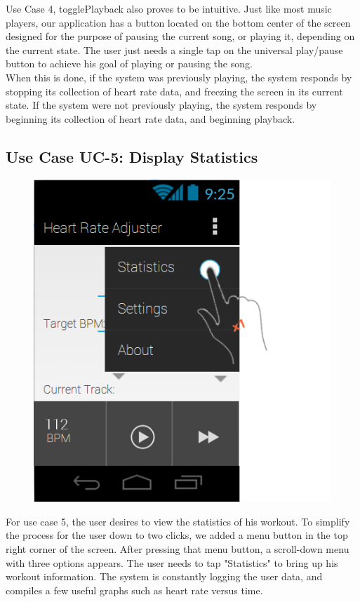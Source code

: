 \documentclass[letterpaper,english, 12pt]{scrreprt}
\begin{document}
Use Case 4, togglePlayback also proves to be intuitive. Just like most music players, our application has a button located on the bottom center of the screen designed for the purpose of pausing the current song, or playing it, depending on the current state. The user just needs a single tap on the universal play/pause button to achieve his goal of playing or pausing the song.\\

When this is done, if the system was previously playing, the system responds by stopping its collection of heart rate data, and freezing the screen in its current state. 
If the system were not previously playing, the system responds by beginning its collection of heart rate data, and beginning playback.

\subsection{Use Case UC-5: Display Statistics}

\begin{figure}[H]
	\centering
	\includegraphics{img/Prelim_Design/PrelimDesign_4.png}\\
\end{figure}

For use case 5, the user desires to view the statistics of his workout.
To simplify the process for the user down to two clicks, we added a menu button in the top right corner of the screen.
After pressing that menu button, a scroll-down menu with three options appears.
The user needs to tap "Statistics" to bring up his workout information.
The system is constantly logging the user data, and compiles a few useful graphs such as heart rate versus time.
\end{document}
